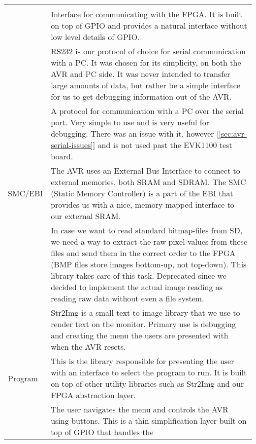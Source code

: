\begin{table}[htbp]
\begin{tabular}{l|p{10cm}}
\begin{comment}
	GPIO, and provide a more natural interface for us to use. \\
\end{comment}
	FPGA/GPIO & Interface for communicating with the FPGA. It is built on top of GPIO
	and provides a natural interface without low level details of GPIO. \\
	\hline
\begin{comment}
	RS232 & RS232 is our protocol of choice for serial communication with a PC. It
	was chosen for its simplicity, on both the AVR and PC side. It was never
	intended to transfer large amounts of data, but rather be a simple
	interface for us to get debugging information out of the AVR. \\
\end{comment}
	RS232 & A protocol for communication with a PC over the serial port. Very simple to
	use and is very useful for debugging. There was an issue with it, however [\ref{sec:avr-serial-issues}]
	and is not used past the EVK1100 test board. \\
	\hline
	SMC/EBI & The AVR uses an External Bus Interface to connect to external memories,
	both SRAM and SDRAM.
	The SMC (Static Memory Controller) is a part of the EBI that provides us
	with a nice, memory-mapped interface to our external SRAM. \\
	\hline
\begin{comment}
	BMP & In case we want to read standard bitmap-files from SD, we need a way to
	extract the raw pixel values from these files and send them in the
	correct order to the FPGA (BMP files store images bottom-up, not
	top-down). This library takes care of this task. Deprecated since we
	decided to implement the actual image reading as reading raw data without
	even a file system. \\
	\hline
\end{comment}
	Str2Img & Str2Img is a small text-to-image library that we use to render text on
	the monitor. Primary use is debugging and creating the menu the users are presented
	with when the AVR resets. \\
	\hline
	Program & This is the library responsible for presenting the user with an
	interface to select the program to run. It is built on top of other
	utility libraries such as Str2Img and our FPGA abstraction layer. \\
	\hline
\begin{comment}
	\hline
	Button & The user navigates the menu and controls the AVR using buttons. This is
	a thin simplification layer built on top of GPIO that handles the

\end{comment}
\end{tabular}
\end{table}
